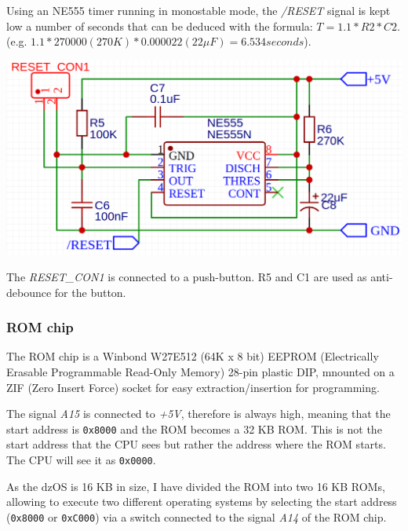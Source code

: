 \documentclass[a4paper,11pt]{article}
\begin{document}
    Using an NE555 timer running in monostable mode, the \textit{/RESET} signal
    is kept low a number of seconds that can be deduced with the formula: 
    $T = 1.1 * R2 * C2$. (e.g. $1.1 * 270000 (270K) * 0.000022 (22\mu F) = 
    6.534 seconds$).

    \begin{center}
        \includegraphics[scale=0.3]{dastaz80resetcircuit.png}
    \end{center}

    The \textit{RESET\_CON1} is connected to a push-button. R5 and C1 are used as 
    anti-debounce for the button.

    \subsubsection{ROM chip}

    The ROM chip is a Winbond W27E512 (64K x 8 bit) EEPROM (Electrically Erasable
    Programmable Read-Only Memory) 28-pin plastic DIP, mnounted on a ZIF (Zero
    Insert Force) socket for easy extraction/insertion for programming.

    The signal \textit{A15} is connected to \textit{+5V}, therefore is always
    high, meaning that the start address is \texttt{0x8000} and the ROM becomes
    a 32 KB ROM. This is not the start address that the CPU sees but rather the
    address where the ROM starts. The CPU will see it as \texttt{0x0000}.

    As the dzOS is 16 KB in size, I have divided the ROM into two 16 KB ROMs, 
    allowing to execute two different operating systems by selecting the start
    address (\texttt{0x8000} or \texttt{0xC000}) via a switch connected to the
    signal \textit{A14} of the ROM chip.
\end{document}
